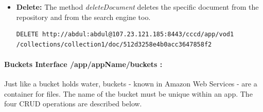 \begin{itemize}
\item \textbf{Delete:} The method \textit{deleteDocument} deletes the specific document from the repository and from the search engine too.

\begin{code}
\begin{verbatim}
DELETE http://abdul:abdul@107.23.121.185:8443/cccd/app/vod1
/collections/collection1/doc/512d3258e4b0acc3647858f2
\end{verbatim}
\end{code}
 
\end{itemize}
\paragraph{Buckets Interface /app/{appName}/buckets :} Just like a bucket holds water, buckets - known in Amazon Web Services - are a container for files. The name of the bucket must be unique within an app. The four \ac{CRUD} operations are described below.

